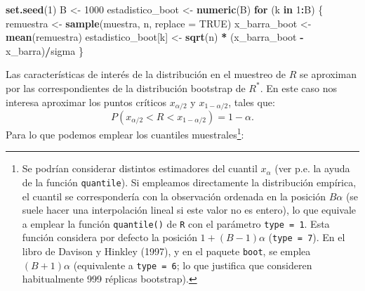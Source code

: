 \documentclass[]{book}
\newenvironment{Shaded}{\begin{snugshade}}{\end{snugshade}}
\newcommand{\KeywordTok}[1]{\textcolor[rgb]{0.13,0.29,0.53}{\textbf{#1}}}
\newcommand{\DataTypeTok}[1]{\textcolor[rgb]{0.13,0.29,0.53}{#1}}
\newcommand{\DecValTok}[1]{\textcolor[rgb]{0.00,0.00,0.81}{#1}}
\newcommand{\StringTok}[1]{\textcolor[rgb]{0.31,0.60,0.02}{#1}}
\newcommand{\OtherTok}[1]{\textcolor[rgb]{0.56,0.35,0.01}{#1}}
\newcommand{\ControlFlowTok}[1]{\textcolor[rgb]{0.13,0.29,0.53}{\textbf{#1}}}
\newcommand{\OperatorTok}[1]{\textcolor[rgb]{0.81,0.36,0.00}{\textbf{#1}}}
\newcommand{\NormalTok}[1]{#1}
\let\rmarkdownfootnote\footnote%
\def\footnote{\protect\rmarkdownfootnote}
\theoremstyle{definition}
\theoremstyle{definition}
\theoremstyle{definition}
\theoremstyle{remark}
\begin{document}
\begin{Shaded}
\begin{Highlighting}[]
\KeywordTok{set.seed}\NormalTok{(}\DecValTok{1}\NormalTok{)}
\NormalTok{B <-}\StringTok{ }\DecValTok{1000}
\NormalTok{estadistico_boot <-}\StringTok{ }\KeywordTok{numeric}\NormalTok{(B)}
\ControlFlowTok{for}\NormalTok{ (k }\ControlFlowTok{in} \DecValTok{1}\OperatorTok{:}\NormalTok{B) \{}
\NormalTok{    remuestra <-}\StringTok{ }\KeywordTok{sample}\NormalTok{(muestra, n, }\DataTypeTok{replace =} \OtherTok{TRUE}\NormalTok{)}
\NormalTok{    x_barra_boot <-}\StringTok{ }\KeywordTok{mean}\NormalTok{(remuestra)}
\NormalTok{    estadistico_boot[k] <-}\StringTok{ }\KeywordTok{sqrt}\NormalTok{(n) }\OperatorTok{*}\StringTok{ }\NormalTok{(x_barra_boot }\OperatorTok{-}\StringTok{ }\NormalTok{x_barra)}\OperatorTok{/}\NormalTok{sigma}
\NormalTok{\}}
\end{Highlighting}
\end{Shaded}

Las características de interés de la distribución en el muestreo de
\(R\) se aproximan por las correspondientes de la distribución bootstrap
de \(R^{\ast}\). En este caso nos interesa aproximar los puntos críticos
\(x_{\alpha /2}\) y \(x_{1-\alpha /2}\), tales que:
\[P\left( x_{\alpha /2} < R < x_{1-\alpha /2} \right) = 1-\alpha.\] Para
lo que podemos emplear los cuantiles muestrales\footnote{Se podrían
  considerar distintos estimadores del cuantil \(x_{\alpha}\) (ver p.e.
  la ayuda de la función \texttt{quantile}). Si empleamos directamente
  la distribución empírica, el cuantil se correspondería con la
  observación ordenada en la posición \(B \alpha\) (se suele hacer una
  interpolación lineal si este valor no es entero), lo que equivale a
  emplear la función \texttt{quantile()} de \texttt{R} con el parámetro
  \texttt{type\ =\ 1}. Esta función considera por defecto la posición
  \(1 + (B - 1) \alpha\) (\texttt{type\ =\ 7}). En el libro de Davison y
  Hinkley (1997), y en el paquete \texttt{boot}, se emplea
  \((B + 1) \alpha\) (equivalente a \texttt{type\ =\ 6}; lo que
  justifica que consideren habitualmente 999 réplicas bootstrap).}:
\end{document}
